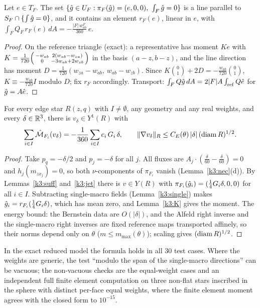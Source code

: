 \begin{lemma}\label{k3:K}
Let $e\in T_F$. The set $\{\gh\in U_F:\pi_F(\gh)=(e,0,0),\ \int_F\gh=0\}$ is a line parallel to $S_F\cap\{\int\hat g=0\}$, and it contains an element $r_F(e)$, linear in $e$, with $\int_FQ_F\,r_F(e)\,dA=-\frac{|F|\,w^F_{ab}}{360}\,e$. 
\end{lemma}

\begin{proof}
On the reference triangle (exact): a representative has moment $Ke$ with $K=\frac1{720}\begin{psmallmatrix}-w_{ab}&2(w_{ab}-w_{za})\\0&-3w_{ab}+2w_{zb}\end{psmallmatrix}$ in the basis $(a-z,b-z)$, and the line direction has moment $D=\frac1{720}(w_{za}-w_{ab},\,w_{ab}-w_{zb})$. Since $K\binom01+2D=-\frac{w_{ab}}{720}\binom01$, $K\equiv-\frac{w_{ab}}{720}I$ modulo $D$; fix $r_F$ accordingly. Transport: $\int_FQ\hat g\,dA=2|F|A\int_{\rm ref}Q\hat e$ for $\hat g=A\hat e$.
\end{proof}

\begin{theorem}\label{k3:vertex}
For every edge star $R(z,q)$ with $I\ne\emptyset$, any geometry and any real weights, and every $\delta\in\mathbb R^3$, there is $v_\delta\in Y^1(R)$ with
\[
\sum_{i\in I}\hat{\mathcal M}_{F_i}(v_\delta)=-\frac1{360}\sum_{i\in I}c_i\,G_i\,\delta,\qquad\lVert \nabla v_\delta\rVert_R\le C_E(\theta)\,|\delta|\,(\operatorname{diam} R)^{1/2}.
\]
\end{theorem}

\begin{proof}
Take $p_q=-\delta/2$ and $p_j=-\delta$ for all $j$. All fluxes are $A_j\cdot(\frac\delta{60}-\frac\delta{60})=0$ and $h_j(m_{zx_j})=0$, so both $\nu$-components of $\pi_{F_i}$ vanish (Lemma~\ref{k3:nec}(d)). By Lemmas~\ref{k3:suff} and~\ref{k3:jet} there is $v\in Y(R)$ with $\pi_{F_i}(\hat g_i)=(\frac14G_i\delta,0,0)$ for all $i\in I$. Subtracting single-macro fields (Lemma~\ref{k3:single}) makes $\hat g_i=r_{F_i}(\frac14G_i\delta)$, which has mean zero, and Lemma~\ref{k3:K} gives the moment. The energy bound: the Bernstein data are $O(|\delta|)$, and the Alfeld right inverse and the single-macro right inverses are fixed reference maps transported affinely, so their norms depend only on $\theta$ ($m\le m_{\max}(\theta)$); scaling gives $(\operatorname{diam} R)^{1/2}$.
\end{proof}
In the exact reduced model the formula holds in all $30$ test cases. Where the weights are generic, the test ``modulo the span of the single-macro directions'' can be vacuous; the non-vacuous checks are the equal-weight cases and an independent full finite element computation on three non-flat stars inscribed in the sphere with distinct per-face equal weights, where the finite element moment agrees with the closed form to $10^{-15}$.

